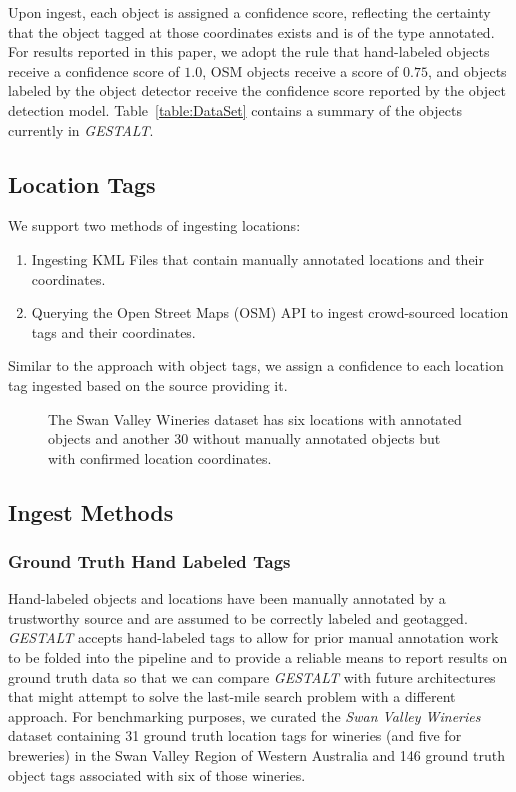 Upon ingest, each object is assigned a confidence score, reflecting the certainty that the object tagged at those coordinates exists and is of the type annotated. 
For results reported in this paper, we adopt the rule that hand-labeled objects receive a confidence score of $1.0$, OSM objects receive a score of $0.75$, and objects labeled by the object detector receive the confidence score reported by the object detection model. Table~\ref{table:DataSet} contains a summary of the objects currently in \emph{GESTALT}.

\subsection{Location Tags}
We support two methods of ingesting locations:
\begin{enumerate}
    \item Ingesting KML Files that contain manually annotated locations and their coordinates.
    \item Querying the Open Street Maps (OSM) API to ingest crowd-sourced location tags and their coordinates. 
\end{enumerate}

Similar to the approach with object tags, we assign a confidence to each location tag ingested based on the source providing it.



\begin{figure}[h!]       
    
    \caption{The Swan Valley Wineries dataset has six locations with annotated objects and another 30 without manually annotated objects but with confirmed location coordinates.}
    \label{fig:loc} 
\end{figure}


\subsection{Ingest Methods}
\subsubsection{Ground Truth Hand Labeled Tags} 
Hand-labeled objects and locations have been manually annotated by a trustworthy source and are assumed to be correctly labeled and geotagged. 
\emph{GESTALT} accepts hand-labeled tags to allow for prior manual annotation work to be folded into the pipeline and to provide a reliable means to report results on ground truth data so that we can compare \emph{GESTALT} with future architectures that might attempt to solve the last-mile search problem with a different approach. 
For benchmarking purposes, we curated the \emph{Swan Valley Wineries} dataset containing 31 ground truth location tags for wineries (and five for breweries) in the Swan Valley Region of Western Australia and 146 ground truth object tags associated with six of those wineries. 

